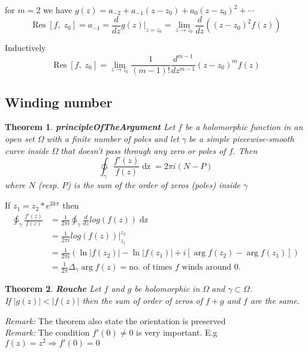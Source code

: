 \documentclass{article}
\newtheorem{theorem}{Theorem}[section]
\newcommand{\OO}{$ \Omega \;$}
\newcommand{\GG}{$ \gamma \;$}
\newcommand{\Res}[2]{\mathop{Res} \left[ #1, \; #2 \right]}
\begin{document}
for $m = 2$ we have $g(z) = a_{-2} + a_{-1}(z-z_0) + a_0(z-z_0)^2 + \cdots$
\[\Res{f}{z_0} = a_{-1} = \frac{d}{dz}g(z)\biggr\rvert_{z=z_0} = \lim_{z \rightarrow z_0}\frac{d}{dz}\left((z-z_0)^2 f(z)\right) \]

Inductively
\[\Res{f}{z_0} = \lim_{z \rightarrow z_0} \frac{1}{(m-1)!} \frac{d^{m-1}}{dz^{m-1}} (z-z_0)^m f(z) \]

\subsection*{Winding number}
\begin{theorem} \label{principleOfTheArgument} \textbf{principleOfTheArgument}
    Let $f$ be a holomorphic function in an open set \OO with a finite number of poles and let \GG be a simple piecewise-smooth curve inside \OO that doesn't pass
    through any zero or poles of $f$. Then
    \[\ointctrclockwise_\gamma \frac{f'(z)}{f(z)} \mathop{dz} = 2\pi i(N-P)\]
    where $N$ (resp. $P$) is the sum of the order of zeros (poles) inside \GG
\end{theorem}

If $z_1 = z_2 * e^{2k\pi}$ then
\begin{align*}
    \ointctrclockwise_\gamma \frac{f'(z)}{f(z)} &= \frac{1}{2\pi i}\ointctrclockwise_\gamma \frac{d}{dz}log\left( f(z) \right) \mathop{dz}\\
                                                &= \frac{1}{2\pi i}log\left( f(z)\right)\biggr\rvert_{z_1}^{z_2}\\
                                                &= \frac{1}{2\pi i} \left( \ln |f(z_2)| - \ln |f(z_1)| + i[\arg f(z_2) - \arg f(z_1)] \right)\\
                                                &= \frac{1}{2\pi} \Delta_\gamma \arg f(z) = \text{no. of times } f \text{ winds around 0.}
\end{align*}

\begin{theorem} \label{Rouche} \textbf{Rouche}
    Let $f$ and $g$ be holomorphic in \OO and $\gamma \subset \Omega$.\\
    If $|g(z)| < |f(z)|$ then the sum of order of zeros of $f+g$ and $f$ are the same.
\end{theorem}
\textit{Remark: } The theorem also state the orientation is preserved\\
\textit{Remark: } The condition $f'(0) \neq 0$ is very important. E.g $f(z) = z^2 \Rightarrow f'(0) = 0$ 
\end{document}
